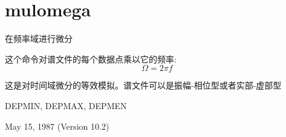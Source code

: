 \section{mulomega}
\label{cmd:mulomega}

在频率域进行微分

这个命令对谱文件的每个数据点乘以它的频率:
\[ \Omega = 2 \pi f\]

这是对时间域微分的等效模拟。谱文件可以是振幅-相位型或者实部-虚部型

DEPMIN, DEPMAX, DEPMEN

May 15, 1987 (Version 10.2)
